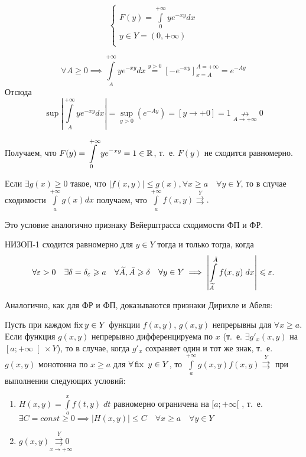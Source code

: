 \documentclass[../../main.tex]{subfiles}
\begin{document}
\begin{exmp}
\[ \left\{\begin{array}{l}
		F(y)=\int\limits_0^{+\infty}ye^{-xy}dx\\
		y \in Y = (0,+\infty)\\
		\end{array}
		\right. \]

\[\forall A \ge 0 \implies \int\limits_A^{+\infty}ye^{-xy}dx \overset{y > 0} = 
\left[-e^{-xy} \right]_{x = A}^{A = +\infty} = e^{-Ay}\]
Отсюда
\[\sup\left| \int\limits_A^{+\infty}ye^{-xy}dx \right|=\underset{y > 0}\sup  
\left( e^{-Ay}\right) = \left[y \to +0\right] = 1 \underset{A \to 
+\infty}\nrightarrow 0\]

Получаем, что $F(y) = \displaystyle\int\limits_0^{+\infty}ye^{-xy} = 1 \in 
\mathbb{R}$, т.~е. $F(y)$ не сходится 
равномерно.
\end{exmp}

\begin{thm}
Если $\exists g(x) \ge 0$ такое, что $\left| f(x,y) \right| \le g(x), \forall 
x \ge a\quad
\forall y \in Y $, то в случае сходимости $\int\limits_a^{+\infty}g(x)dx$ 
получаем, что 
$\int\limits_a^{+\infty}f(x,y) \overset{Y}\rightrightarrows.$ 
\end{thm}

Это условие аналогично признаку Вейерштрасса сходимости ФП и ФР.

\begin{crl*}
НИЗОП-1 сходится равномерно для $ y \in Y$ тогда и только тогда, 
когда\begin{equation}\label{lec10:11} \forall \varepsilon > 0\quad \exists \delta = 
\delta_\varepsilon \geqslant a\quad \forall \widetilde{A}, \bar{A} \geqslant \delta \quad \forall 
y 
\in Y \implies \left| \int\limits_{\widetilde{A}}^{\bar{A}}f(x,y)\;dx \right| 
\leqslant
\varepsilon. \end{equation}
\end{crl*}

Аналогично, как для ФР и ФП, доказываются признаки Дирихле и Абеля:

\begin{thm}

Пусть при каждом $\operatorname{fix} y \in Y$ функции $f(x,y)$, $g(x,y)$ непрерывны 
для $\forall x \ge a$. Если функция $g(x,y)$ непрерывно дифференцируема по $x$
(т.~е. $\exists g'_x(x,y)$ на $\left[a;+\infty\right[ \times Y $), то в 
случае, когда $g'_x$ сохраняет один и тот же знак, т.~е. $g(x,y)$ 
монотонна по $x \ge a$ для $\forall \operatorname{fix} \ y \in Y$, то 
$\int\limits_a^{+\infty} g(x,y)f(x,y) \overset{Y}{\rightrightarrows}$ при 
выполнении следующих условий:
\begin{enumerate}
\item $H(x,y) = \int\limits_a^x f(t,y)\;dt$ равномерно ограничена на 
$[a;+\infty[$ 
, т.~е. $\exists C = const \ge 0 \implies \left|H(x,y)\right| \le C \quad
\forall x \ge a\quad \forall y \in Y$
\item $g(x,y)\underset{x \to +\infty}{\overset{Y}{\rightrightarrows} 0}$
\end{enumerate}
\end{thm}
\end{document}
